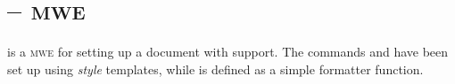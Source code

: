 \documentclass{article}
\begin{document}
\section*{ -- \textsc{mwe}}

 is a \textsc{mwe} for setting up a document with
 support.  The commands 
and  have been set up using \emph{style} templates,
while  is defined as a simple formatter function.
\end{document}
